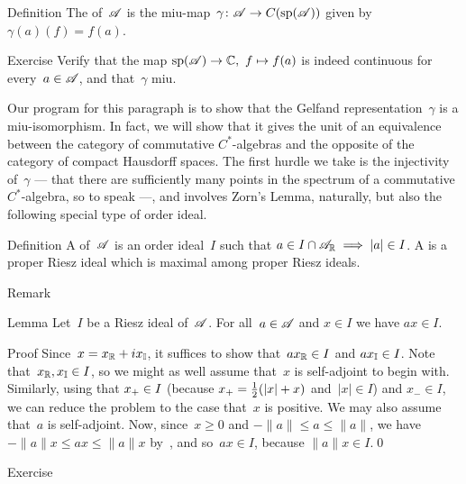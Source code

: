 \documentclass[main]{subfiles}
\begin{document}
\begin{parsec}
\begin{point}{Definition}
The 
of~$\mathscr{A}$
is the miu-map~$\gamma\colon \mathscr{A}\to C(\mathrm{sp}(\mathscr{A}))$
given by $\gamma(a)(f)=f(a)$.
\begin{point}{Exercise}%
Verify that 
 the map $\mathrm{sp}(\mathscr{A})\to \mathbb{C},\ f\mapsto f(a)$ is indeed
continuous for every~$a\in\mathscr{A}$,
and that~$\gamma$ miu.
\end{point}
\end{point}
\begin{point}%
Our program for this paragraph is to show that
the Gelfand representation~$\gamma$ is 
a miu-isomorphism.
In fact,
we will show that it gives the unit
of an equivalence between the category of commutative $C^*$-algebras
and the opposite of the category of compact Hausdorff spaces.
The first hurdle we take is the injectivity of~$\gamma$
--- that there are sufficiently many
points in the spectrum of a commutative $C^*$-algebra,
so to speak ---,
and involves Zorn's Lemma,
naturally,
but also the following special type of order ideal.
\end{point}
\begin{point}{Definition}%
A  of~$\mathscr{A}$
is an order ideal~$I$
such that $a\in I\cap\mathscr{A}_{\mathbb{R}}\implies \left|a\right|\in I$.
A 
is a proper Riesz ideal which is maximal among
proper Riesz ideals.
\begin{point}{Remark}%
\end{point}
\end{point}
\begin{point}{Lemma}%
Let~$I$ be a Riesz ideal of~$\mathscr{A}$.
For all~$a\in \mathscr{A}$ and $x\in I$ we have $ax\in I$.
\begin{point}{Proof}%
Since~$x=x_{\mathbb{R}}+ix_{\mathbb{I}}$,
it suffices to show that~$ax_{\mathbb{R}}\in I$ and $ax_{\mathbb{I}}\in I$.
Note that~$x_{\mathbb{R}},x_{\mathbb{I}}\in I$,
so we might as well assume that~$x$ is self-adjoint to begin with.
Similarly, using that
 $x_{+}\in I$ (because $x_{+}=\frac{1}{2}(\left|x\right|+x)$
and~$\left|x\right|\in I$) and $x_-\in I$,
we can reduce the problem to the case that~$x$ is positive.
We may also assume that~$a$ is self-adjoint.
Now, since~$x\geq 0$ and $-\|a\|\leq a\leq \|a\|$,
we have $-\|a\|x \leq ax\leq \|a\|x$
by~,
and so~$ax\in I$,
because $\|a\|x\in I$.\qed
\end{point}
\end{point}
\begin{point}{Exercise}%

\end{point}
\end{parsec}
\end{document}
